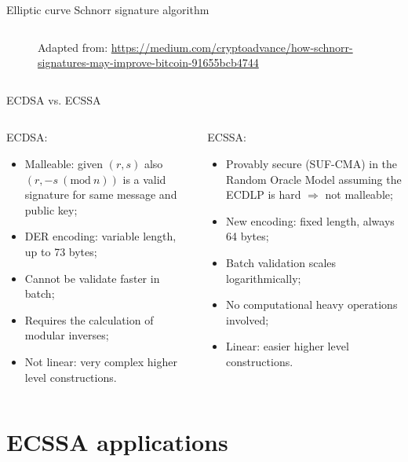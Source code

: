 \documentclass[slidescentered]{beamer}
\newcommand{\source}[1]{\caption*{\tiny Adapted from: {#1}} }
\begin{document}
\begin{frame}{Elliptic curve Schnorr signature algorithm}
\begin{columns}
\begin{column}{0.5\linewidth}
\begin{figure}
{						\source{\tiny \url{https://medium.com/cryptoadvance/how-schnorr-signatures-may-improve-bitcoin-91655bcb4744}}}
				\end{figure}
			\end{column}
		\end{columns}
	\end{frame}

	\begin{frame}{ECDSA vs. ECSSA}
		\begin{columns}
			\begin{column}{0.5\linewidth}
				ECDSA:
				\begin{itemize}
					\item<2 -> Malleable: given $(r, s)$ also $(r, -s \ (\text{mod} \ n))$ is a valid signature for same message and public key;
					\item<3 -> DER encoding: variable length, up to 73 bytes;
					\item<4 -> Cannot be validate faster in batch;
					\item<5 -> Requires the calculation of modular inverses;
					\item<6 -> Not linear: very complex higher level constructions.
				\end{itemize}
			\end{column}
			\begin{column}{0.5\linewidth}
				ECSSA:
				\begin{itemize}
					\item<2 -> Provably secure (SUF-CMA) in the Random Oracle Model assuming the ECDLP is hard $\Longrightarrow$ not malleable;
					\item<3 -> New encoding: fixed length, always 64 bytes;
					\item<4 -> Batch validation scales logarithmically;
					\item<5 -> No computational heavy operations involved;
					\item<6 -> Linear: easier higher level constructions.
				\end{itemize}
			\end{column}
		\end{columns}
	\end{frame}
	
	\section{ECSSA applications}
	
\end{document}
